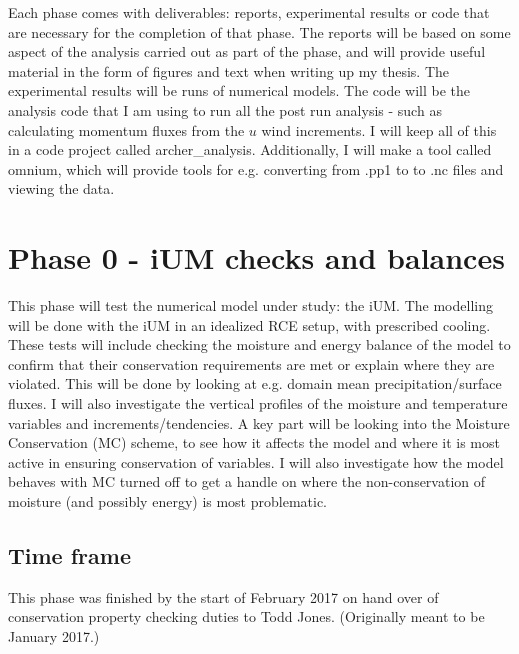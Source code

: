 \documentclass[11pt,a4paper]{article}
\begin{document}
Each phase comes with deliverables: reports, experimental results or code that are necessary for the completion of that phase. The reports will be based on some aspect of the analysis carried out as part of the phase, and will provide useful material in the form of figures and text when writing up my thesis. The experimental results will be runs of numerical models. The code will be the analysis code that I am using to run all the post run analysis - such as calculating momentum fluxes from the $u$ wind increments. I will keep all of this in a code project called archer\_analysis. Additionally, I will make a tool called omnium, which will provide tools for e.g. converting from .pp1 to to .nc files and viewing the data.

\section*{Phase 0 - iUM checks and balances}
This phase will test the numerical model under study: the iUM. The modelling will be done with the iUM in an idealized RCE setup, with prescribed cooling. These tests will include checking the moisture and energy balance of the model to confirm that their conservation requirements are met or explain where they are violated. This will be done by looking at e.g. domain mean precipitation/surface fluxes. I will also investigate the vertical profiles of the moisture and temperature variables and increments/tendencies. A key part will be looking into the Moisture Conservation (MC) scheme, to see how it affects the model and where it is most active in ensuring conservation of variables. I will also investigate how the model behaves with MC turned off to get a handle on where the non-conservation of moisture (and possibly energy) is most problematic.

\subsection*{Time frame}

This phase was finished by the start of February 2017 on hand over of conservation property checking duties to Todd Jones. (Originally meant to be January 2017.)
\end{document}
